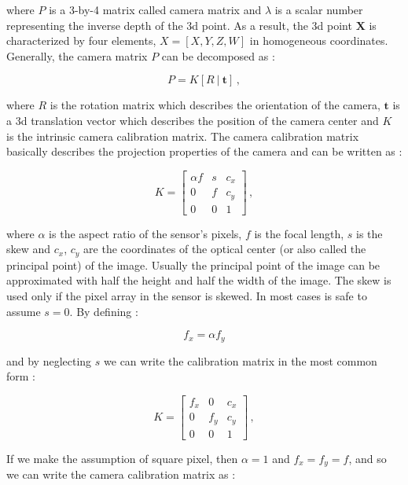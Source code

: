 where $P$ is a 3-by-4 matrix called camera matrix and $\lambda$ is a scalar number representing the inverse depth of the \acrshort{3d} point. As a result, the \acrshort{3d} point $\mathbf{X}$ is characterized by four elements, $X = [X, Y , Z, W ]$ in homogeneous coordinates.
Generally, the camera matrix $P$ can be decomposed as :

\begin{equation*}
  P = K[R \ | \ \mathbf{t}] \,,
\end{equation*}

where $R$ is the rotation matrix which describes the orientation of the camera, $\mathbf{t}$ is a \acrshort{3d} translation vector which describes the position of the camera center and $K$ is the intrinsic camera calibration matrix.
The camera calibration matrix basically describes the projection properties of the camera and can be written as :

\begin{equation*}
  K = \begin{bmatrix}
    \alpha f & s & c_x \\
    0        & f & c_y \\
    0        & 0 & 1
  \end{bmatrix} \,,
\end{equation*}

where $\alpha$ is the aspect ratio of the sensor's pixels, $f$ is the focal length, $s$ is the skew and $c_x$, $c_y$ are the coordinates of the optical center (or also called the principal point) of the image. Usually the principal point of the image can be approximated with half the height and half the width of the image. The skew is used only if the pixel array in the sensor is skewed. In most cases is safe to assume $s = 0$.
By defining :

\begin{equation*}
  f_x = \alpha f_y
\end{equation*}

and by neglecting $s$ we can write the calibration matrix in the most common form :

\begin{equation*}
  K = \begin{bmatrix}
    f_x & 0   & c_x \\
    0   & f_y & c_y \\
    0   & 0   & 1
  \end{bmatrix} \,,
\end{equation*}

If we make the assumption of square pixel, then $\alpha = 1 $ and $ f_x = f_y = f$, and so we can write the camera calibration matrix as :

